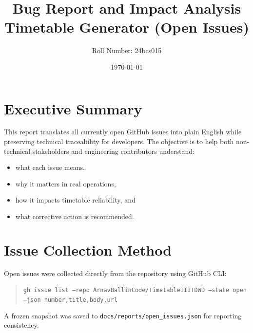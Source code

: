 \documentclass[12pt,a4paper]{article}
\title{Bug Report and Impact Analysis\\\large Timetable Generator (Open Issues)}
\author{Roll Number: 24bcs015}
\date{\today}
\begin{document}
\maketitle

\section*{Executive Summary}
This report translates all currently open GitHub issues into plain English while preserving technical traceability for developers. The objective is to help both non-technical stakeholders and engineering contributors understand:
\begin{itemize}[leftmargin=1.2cm]
  \item what each issue means,
  \item why it matters in real operations,
  \item how it impacts timetable reliability, and
  \item what corrective action is recommended.
\end{itemize}

\section{Issue Collection Method}
Open issues were collected directly from the repository using GitHub CLI:
\begin{quote}
\texttt{gh issue list --repo ArnavBallinCode/TimetableIIITDWD --state open --json number,title,body,url}
\end{quote}
A frozen snapshot was saved to \texttt{docs/reports/open\_issues.json} for reporting consistency.
\end{document}
